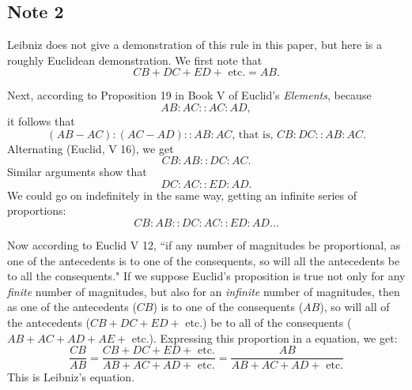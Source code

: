 \documentclass[polutonikogreek,english,twoside,openright]{article}
\begin{document}
\subsection*{Note 2}
\label{caa2}

Leibniz does not give a demonstration of this rule in this paper, but here is a roughly Euclidean demonstration.
We first note that
$$CB + DC + ED + \mbox{ etc.} = AB.$$

Next, according to Proposition 19 in Book V of Euclid's {\em Elements}, because 
$$AB\!:\!AC :: AC\!:\!AD,$$
it follows that 
$$(AB-AC)\!:\!(AC-AD) :: AB\!:\!AC\mbox{, that is, } CB\!:\!DC :: AB\!:\!AC.$$
Alternating (Euclid, V 16), we get
$$CB\!:\!AB :: DC\!:\!AC.$$
Similar arguments show that 
$$ DC\!:\!AC :: ED\!:\!AD.$$  We could go on indefinitely in the same way, getting an infinite series of proportions:
$$CB\!:\!AB :: DC\!:\!AC :: ED\!:\!AD \ldots$$


Now according to Euclid V 12, ``if any number of magnitudes be proportional, as one of the antecedents is to one of the consequents, so will all the antecedents be to all the consequents."  If we suppose Euclid's proposition is true not only for any {\em finite} number of magnitudes, but also for an {\em infinite} number of magnitudes, then as one of the antecedents ($CB$) is to one of the consequents ($AB$), so will all of the antecedents ($CB + DC + ED +$ etc.) be to all of the consequents ($AB + AC + AD + AE +$ etc.).  Expressing this proportion in a equation, we get:
$$\frac{CB}{AB} = \frac{CB + DC + ED + \mbox{ etc.}}{AB + AC + AD + \mbox{ etc.} } = \frac{AB}{AB + AC + AD + \mbox{ etc.}}$$
This is Leibniz's equation.
\end{document}
